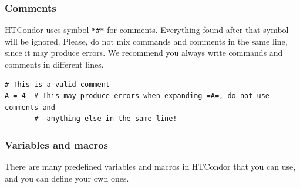 \documentclass[a4paper,10pt]{article}
\begin{document}
\subsubsection{Comments}
\label{sec:orgb4983d3}

HTCondor uses symbol \texttt{*\#*} for comments. Everything found after that symbol will
be ignored. Please, do not mix commands and comments in the same line, since it
may produce errors. We recommend you always write commands and comments in
different lines.

\begin{verbatim}
# This is a valid comment
A = 4  # This may produce errors when expanding =A=, do not use comments and 
       #  anything else in the same line!
\end{verbatim}

\subsubsection{Variables and macros}
\label{sec:org3790d71}

There are many predefined variables and macros in HTCondor that you can use, and
you can define your own ones.
\end{document}
